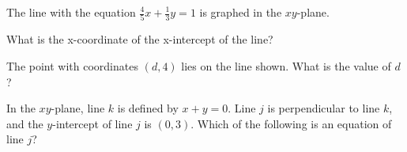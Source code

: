 \newpage
\noindent\markforreview

\vspace{1em}

The line with the equation \( \frac{4}{5}x + \frac{1}{3}y = 1 \) is graphed in the \( xy \)-plane.

\vspace{2mm}
What is the x-coordinate of the x-intercept of the line?


\vspace{2em}

\noindent\markforreview

\vspace{1em}

\begin{center}
\end{center}

The point with coordinates $(d, 4)$ lies on the line shown. What is the value of $d$?

\vspace{0.75em}


\vspace{2em}

\noindent\markforreview

\vspace{1em}

In the $xy$-plane, line $k$ is defined by $x + y = 0$. Line $j$ is perpendicular to line $k$, and the $y$-intercept of line $j$ is $(0,3)$. Which of the following is an equation of line $j$?

\vspace{0.75em}



\vspace{2em}


